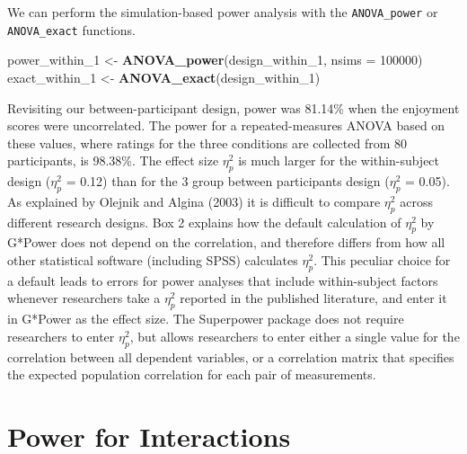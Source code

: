 \documentclass[
  ,jou,floatsintext]{apa6}
\newenvironment{Shaded}{\begin{snugshade}}{\end{snugshade}}
\newcommand{\DataTypeTok}[1]{\textcolor[rgb]{0.13,0.29,0.53}{#1}}
\newcommand{\DecValTok}[1]{\textcolor[rgb]{0.00,0.00,0.81}{#1}}
\newcommand{\KeywordTok}[1]{\textcolor[rgb]{0.13,0.29,0.53}{\textbf{#1}}}
\newcommand{\NormalTok}[1]{#1}
\newcommand{\StringTok}[1]{\textcolor[rgb]{0.31,0.60,0.02}{#1}}
\begin{document}
We can perform the simulation-based power analysis with the \texttt{ANOVA\_power} or \texttt{ANOVA\_exact} functions.

\begin{Shaded}
\begin{Highlighting}[]
\NormalTok{power_within_}\DecValTok{1}\NormalTok{ <-}\StringTok{ }\KeywordTok{ANOVA_power}\NormalTok{(design_within_}\DecValTok{1}\NormalTok{, }
                              \DataTypeTok{nsims =} \DecValTok{100000}\NormalTok{)}
\NormalTok{exact_within_}\DecValTok{1}\NormalTok{ <-}\StringTok{ }\KeywordTok{ANOVA_exact}\NormalTok{(design_within_}\DecValTok{1}\NormalTok{)}
\end{Highlighting}
\end{Shaded}

Revisiting our between-participant design, power was 81.14\% when the enjoyment scores were uncorrelated.
The power for a repeated-measures ANOVA based on these values, where ratings for the three conditions are collected from 80 participants, is 98.38\%.
The effect size \(\eta_p^2\) is much larger for the within-subject design (\(\eta_p^2\) = 0.12) than for the 3 group between participants design (\(\eta_p^2\) = 0.05).
As explained by Olejnik and Algina (2003) it is difficult to compare \(\eta_p^2\) across different research designs.
Box 2 explains how the default calculation of \(\eta_p^2\) by G*Power does not depend on the correlation, and therefore differs from how all other statistical software (including SPSS) calculates \(\eta_p^2\).
This peculiar choice for a default leads to errors for power analyses that include within-subject factors whenever researchers take a \(\eta_p^2\) reported in the published literature, and enter it in G*Power as the effect size.
The Superpower package does not require researchers to enter \(\eta_p^2\), but allows researchers to enter either a single value for the correlation between all dependent variables, or a correlation matrix that specifies the expected population correlation for each pair of measurements.

\hypertarget{power-for-interactions}{%
\section{Power for Interactions}\label{power-for-interactions}}
\end{document}
